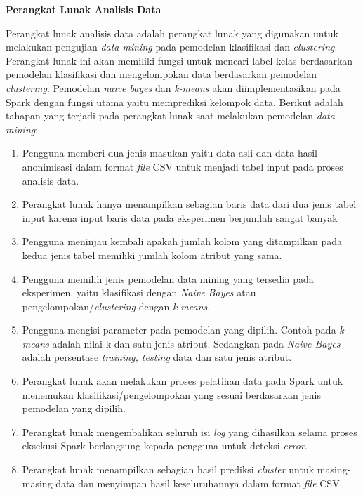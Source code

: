 \documentclass[a4paper,twoside]{article}
\begin{document}
\begin{enumerate}
\textbf{Perangkat Lunak Analisis Data}

Perangkat lunak analisis data adalah perangkat lunak yang digunakan untuk melakukan pengujian \textit{data mining} pada pemodelan klasifikasi dan \textit{clustering}. Perangkat lunak ini akan memiliki fungsi untuk mencari label kelas berdasarkan pemodelan klasifikasi dan mengelompokan data berdasarkan pemodelan \textit{clustering}. Pemodelan \textit{naive bayes} dan \textit{k-means} akan diimplementasikan pada Spark dengan fungsi utama yaitu memprediksi kelompok data. Berikut adalah tahapan yang terjadi pada perangkat lunak saat melakukan pemodelan \textit{data mining}:

\begin{enumerate}

\item Pengguna memberi dua jenis masukan yaitu data asli dan data hasil anonimisasi dalam format \textit{file} CSV untuk menjadi tabel input pada proses analisis data.

\item Perangkat lunak hanya menampilkan sebagian baris data dari dua jenis tabel input karena input baris data pada eksperimen berjumlah sangat banyak 

\item Pengguna meninjau kembali apakah jumlah kolom yang ditampilkan pada kedua jenis tabel memiliki jumlah kolom atribut yang sama.

\item Pengguna memilih jenis pemodelan data mining yang tersedia pada eksperimen, yaitu klasifikasi dengan \textit{Naive Bayes} atau pengelompokan/\textit{clustering} dengan \textit{k-means}. 

\item Pengguna mengisi parameter pada pemodelan yang dipilih. Contoh pada \textit{k-means} adalah nilai k dan satu jenis atribut. Sedangkan pada \textit{Naive Bayes} adalah persentase \textit{training, testing} data dan satu jenis atribut.

\item Perangkat lunak akan melakukan proses pelatihan data pada Spark untuk menemukan klasifikasi/pengelompokan yang sesuai berdasarkan jenis pemodelan yang dipilih.

\item Perangkat lunak mengembalikan seluruh isi \textit{log} yang dihasilkan selama proses eksekusi Spark berlangsung kepada pengguna untuk deteksi \textit{error}.

\item Perangkat lunak menampilkan sebagian hasil prediksi \textit{cluster} untuk masing-masing data dan menyimpan hasil keseluruhannya dalam format \textit{file} CSV.


\end{enumerate}
\end{enumerate}
\end{document}
